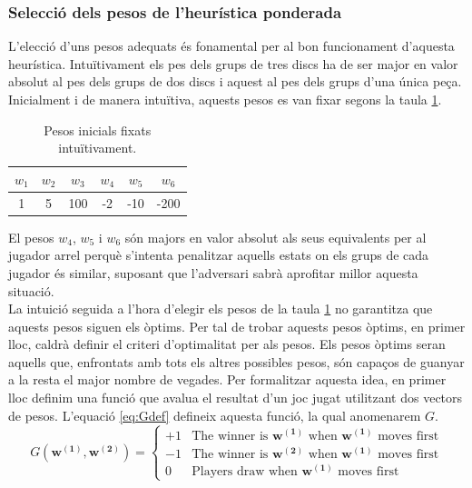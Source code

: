 \documentclass[12pt,a4paper]{article}
\begin{document}
\subsubsection{Selecció dels pesos de l'heurística ponderada}\label{sec:genetic}
L'elecció d'uns pesos adequats és fonamental per al bon funcionament d'aquesta heurística. Intuïtivament els pes dels grups de tres discs ha de ser major en valor absolut al pes dels grups de dos discs i aquest al pes dels grups d'una única peça. Inicialment i de manera intuïtiva, aquests pesos es van fixar segons la taula \ref{tab:init_weights}.\\

\begin{table}[h]
\centering
\begin{tabular}{|c|c|c|c|c|c|}
\hline $w_1$ & $w_2$  & $w_3$ & $w_4$ & $w_5$ & $w_6$ \\
\hline 1 & 5 & 100 & -2 & -10 & -200\\
\hline 
\end{tabular}
\caption{Pesos inicials fixats intuïtivament.}
\label{tab:init_weights}
\end{table}

El pesos $w_4$, $w_5$ i $w_6$ són majors en valor absolut als seus equivalents per al jugador arrel perquè s'intenta penalitzar aquells estats on els grups de cada jugador és similar, suposant que l'adversari sabrà aprofitar millor aquesta situació.\\

La intuició seguida a l'hora d'elegir els pesos de la taula \ref{tab:init_weights} no garantitza que aquests pesos siguen els òptims. Per tal de trobar aquests pesos òptims, en primer lloc, caldrà definir el criteri d'optimalitat per als pesos. Els pesos òptims seran aquells que, enfrontats amb tots els altres possibles pesos, són capaços de guanyar a la resta el major nombre de vegades. Per formalitzar aquesta idea, en primer lloc definim una funció que avalua el resultat d'un joc jugat utilitzant dos vectors de pesos. L'equació \ref{eq:Gdef} defineix aquesta funció, la qual anomenarem $G$.\\

\begin{equation}\label{eq:Gdef}
G(\mathbf{w^{(1)}}, \mathbf{w^{(2)}}) = \begin{cases}
+1 & \text{The winner is } \mathbf{w^{(1)}}\text{ when  } \mathbf{w^{(1)}} \text{ moves first}\\
-1 &\text{The winner is } \mathbf{w^{(2)}}\text{ when  } \mathbf{w^{(1)}} \text{ moves first}\\
0 & \text{Players draw when } \mathbf{w^{(1)}} \text{ moves first}
\end{cases}
\end{equation}
\end{document}
